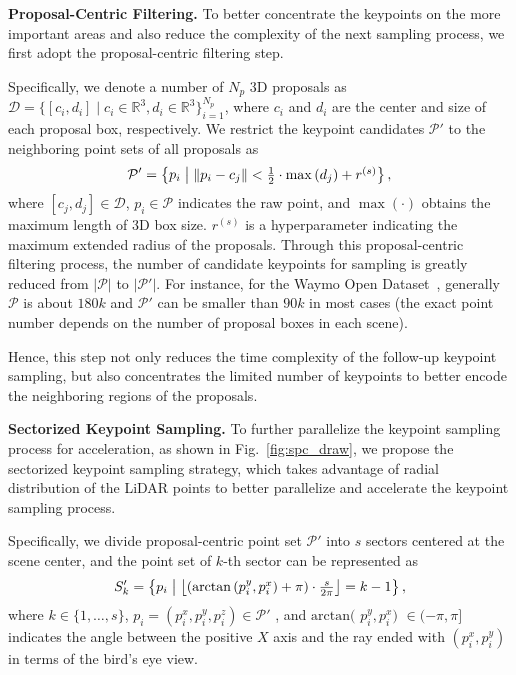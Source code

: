 \documentclass[natbib,twocolumn]{svjour3}          \smartqed  \usepackage{graphicx}
\begin{document}
\noindent
\textbf{Proposal-Centric Filtering.}
To better concentrate the keypoints on the more important areas and also reduce the complexity of the next sampling process, we first adopt the proposal-centric filtering step. 

Specifically, we denote a number of $N_p$ 3D proposals as $\mathcal{D}=\{[c_i, d_i] \mid c_i \in \mathbb{R}^3, d_i \in \mathbb{R}^3\}_{i=1}^{N_p}$, where $c_i$ and $d_i$ are the center and size of each proposal box, respectively. 
We restrict the keypoint candidates $\mathcal{P}'$ to the neighboring point sets of all proposals as
\begin{align}
	\mathcal{P}' =\left\lbrace p_i \;\middle|\;
	\begin{tabular}{@{}c@{}}
		$\left\Vert p_i - c_j \right\Vert <  \frac{1}{2} \cdot {\max \left(d_j\right)} + r^{(s)}$ \\
	\end{tabular}
	\right\rbrace,
\end{align}
where $[c_j, d_j] \in \mathcal{D}$, $p_i \in \mathcal{P}$ indicates the raw point, and $\max(\cdot)$ obtains the maximum length of 3D box size. 
$r^{(s)}$ is a hyperparameter indicating the maximum extended radius of the proposals.
Through this proposal-centric filtering process, the number of candidate keypoints for sampling is greatly reduced from $|\mathcal{P}|$ to $|\mathcal{P}'|$. For instance, for the Waymo Open Dataset~\citep{Sun_2020_CVPR}, generally $\mathcal{P}$ is about $180k$ and $\mathcal{P}'$ can be smaller than $90k$ in most cases (the exact point number depends on the number of proposal boxes in each scene).

Hence, this step not only reduces the time complexity of the follow-up keypoint sampling, but also concentrates the limited number of keypoints to better encode the neighboring regions of the proposals.



\noindent
\textbf{Sectorized Keypoint Sampling.}
To further parallelize the keypoint sampling process for acceleration, as shown in Fig.~\ref{fig:spc_draw}, we propose the sectorized keypoint sampling strategy, which takes advantage of radial distribution of the LiDAR points to better parallelize and accelerate the keypoint sampling process. 

Specifically, we divide proposal-centric point set $\mathcal{P}'$ into $s$ sectors centered at the scene center, and the point set of $k$-th sector can be represented as
\begin{align}
	S'_k =\left\lbrace p_i \;\middle|\;
	\begin{tabular}{@{}c@{}}
		$\left\lfloor \left(\text{arctan}\left(p_i^{y}, p_i^{x}\right) + \pi\right) \cdot \frac{s}{2\pi} \right\rfloor = k - 1$
	\end{tabular}
	\right\rbrace,
\end{align}
where $k \in \{1, \dots, s\}$, $p_i=(p_i^x, p_i^y, p_i^z) \in \mathcal{P}'$
, and $\text{arctan}($ $p_i^y, p_i^x)$ $\in (-\pi, \pi]$ indicates the angle between the positive $X$ axis and the ray ended with $(p_i^x, p_i^y)$ in terms of the bird's eye view.
\end{document}
